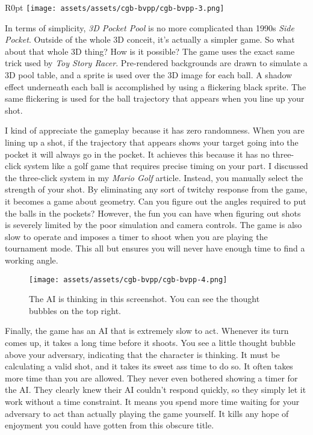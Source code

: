 \documentclass{book}
\begin{document}
\begin{wrapfigure}{R}{0pt} \texttt{[image: assets/assets/cgb-bvpp/cgb-bvpp-3.png]}\end{wrapfigure}
In terms of simplicity, \emph{3D Pocket Pool} is no more complicated than 1990s \emph{Side Pocket}. Outside of the whole 3D conceit, it’s actually a simpler game. So what about that whole 3D thing? How is it possible? The game uses the exact same trick used by \emph{Toy Story Racer}. Pre-rendered backgrounds are drawn to simulate a 3D pool table, and a sprite is used over the 3D image for each ball. A shadow effect underneath each ball is accomplished by using a flickering black sprite. The same flickering is used for the ball trajectory that appears when you line up your shot.

I kind of appreciate the gameplay because it has zero randomness. When you are lining up a shot, if the trajectory that appears shows your target going into the pocket it will always go in the pocket. It achieves this because it has no three-click system like a golf game that requires precise timing on your part. I discussed the three-click system in my \emph{Mario Golf} article. Instead, you manually select the strength of your shot. By eliminating any sort of twitchy response from the game, it becomes a game about geometry. Can you figure out the angles required to put the balls in the pockets? However, the fun you can have when figuring out shots is severely limited by the poor simulation and camera controls. The game is also slow to operate and imposes a timer to shoot when you are playing the tournament mode. This all but ensures you will never have enough time to find a working angle.

\begin{figure}[hbt]
\vskip 10pt
\centering \texttt{[image: assets/assets/cgb-bvpp/cgb-bvpp-4.png]}\par\pagetwodescription The AI is thinking in this screenshot. You can see the thought bubbles on the top right.
\vskip 6pt
\end{figure}
Finally, the game has an AI that is extremely slow to act. Whenever its turn comes up, it takes a long time before it shoots. You see a little thought bubble above your adversary, indicating that the character is thinking. It must be calculating a valid shot, and it takes its sweet ass time to do so. It often takes more time than you are allowed. They never even bothered showing a timer for the AI. They clearly knew their AI couldn’t respond quickly, so they simply let it work without a time constraint. It means you spend more time waiting for your adversary to act than actually playing the game yourself. It kills any hope of enjoyment you could have gotten from this obscure title.
\end{document}
